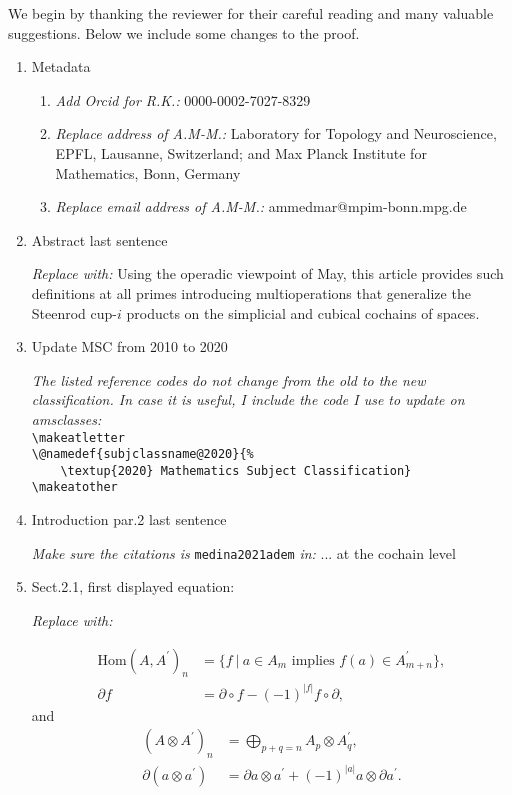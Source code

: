 \documentclass{amsart}
\theoremstyle{definition}
\newcommand{\Hom}{\mathrm{Hom}}
\begin{document}
We begin by thanking the reviewer for their careful reading and many valuable suggestions.
Below we include some changes to the proof.

\begin{enumerate}

\item Metadata \par
\begin{enumerate}
	\item \textit{Add Orcid for R.K.:}
0000-0002-7027-8329

\item \textit{Replace address of A.M-M.:}
Laboratory for Topology and Neuroscience, EPFL, Lausanne, Switzerland; and Max Planck Institute for Mathematics, Bonn, Germany

\item \textit{Replace email address of A.M-M.:}
ammedmar@mpim-bonn.mpg.de
\end{enumerate}

\item Abstract last sentence \par
\textit{Replace with:}
Using the operadic viewpoint of May, this article provides such definitions at all primes introducing multioperations that generalize the Steenrod cup-$i$ products on the simplicial and cubical cochains of spaces.

\item Update MSC from 2010 to 2020 \par
\textit{The listed reference codes do not change from the old to the new classification. In case it is useful, I include the code I use to update on amsclasses:} \\
\verb|\makeatletter| \\
\verb|\@namedef{subjclassname@2020}{%| \\
\verb|    \textup{2020} Mathematics Subject Classification}| \\
\verb|\makeatother|

\item Introduction par.2 last sentence \par
\textit{Make sure the citations is} \verb|medina2021adem| \textit{in:} ... at the cochain level \cite{medina2020cartan, medina2021adem}


\item Sect.2.1, first displayed equation: \par
\textit{Replace with:}

\begin{align*}
\Hom(A, A^\prime)_n & = \big\{f \ |\ a \in A_m \text{ implies } f(a) \in A^\prime_{m+n} \big\}, \\
\partial f & = \partial \circ f - (-1)^{|f|}f \circ \partial,
\end{align*}
and
\begin{align*}
(A \otimes A^\prime)_n & = \bigoplus_{p + q = n} A_p \otimes A^\prime_q, \\
\partial (a \otimes a^\prime) & = \partial a \otimes a^\prime + (-1)^{|a|} a \otimes \partial a^\prime.
\end{align*}


\end{enumerate}
\end{document}
